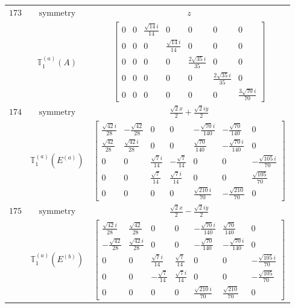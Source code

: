 \documentclass[fleqn,8pt,landscape]{jsarticle}
\begin{document}
\begin{longtable}{ccc}
$ 173 $ & $ \text{symmetry} $ & $ z $ \\
$  $ & $ \mathbb{T}_{1}^{(a)}(A) $ & $ \begin{bmatrix} 0 & 0 & \frac{\sqrt{14} i}{14} & 0 & 0 & 0 & 0 \\ 0 & 0 & 0 & \frac{\sqrt{14} i}{14} & 0 & 0 & 0 \\ 0 & 0 & 0 & 0 & \frac{2 \sqrt{35} i}{35} & 0 & 0 \\ 0 & 0 & 0 & 0 & 0 & \frac{2 \sqrt{35} i}{35} & 0 \\ 0 & 0 & 0 & 0 & 0 & 0 & \frac{3 \sqrt{70} i}{70} \end{bmatrix} $ \\ \hline
$ 174 $ & $ \text{symmetry} $ & $ \frac{\sqrt{2} x}{2} + \frac{\sqrt{2} i y}{2} $ \\
$  $ & $ \mathbb{T}_{1}^{(a)}(E^{(a)}) $ & $ \begin{bmatrix} \frac{\sqrt{42} i}{28} & - \frac{\sqrt{42}}{28} & 0 & 0 & - \frac{\sqrt{70} i}{140} & - \frac{\sqrt{70}}{140} & 0 \\ \frac{\sqrt{42}}{28} & \frac{\sqrt{42} i}{28} & 0 & 0 & \frac{\sqrt{70}}{140} & - \frac{\sqrt{70} i}{140} & 0 \\ 0 & 0 & \frac{\sqrt{7} i}{14} & - \frac{\sqrt{7}}{14} & 0 & 0 & - \frac{\sqrt{105} i}{70} \\ 0 & 0 & \frac{\sqrt{7}}{14} & \frac{\sqrt{7} i}{14} & 0 & 0 & \frac{\sqrt{105}}{70} \\ 0 & 0 & 0 & 0 & \frac{\sqrt{210} i}{70} & - \frac{\sqrt{210}}{70} & 0 \end{bmatrix} $ \\ \hline
$ 175 $ & $ \text{symmetry} $ & $ \frac{\sqrt{2} x}{2} - \frac{\sqrt{2} i y}{2} $ \\
$  $ & $ \mathbb{T}_{1}^{(a)}(E^{(b)}) $ & $ \begin{bmatrix} \frac{\sqrt{42} i}{28} & \frac{\sqrt{42}}{28} & 0 & 0 & - \frac{\sqrt{70} i}{140} & \frac{\sqrt{70}}{140} & 0 \\ - \frac{\sqrt{42}}{28} & \frac{\sqrt{42} i}{28} & 0 & 0 & - \frac{\sqrt{70}}{140} & - \frac{\sqrt{70} i}{140} & 0 \\ 0 & 0 & \frac{\sqrt{7} i}{14} & \frac{\sqrt{7}}{14} & 0 & 0 & - \frac{\sqrt{105} i}{70} \\ 0 & 0 & - \frac{\sqrt{7}}{14} & \frac{\sqrt{7} i}{14} & 0 & 0 & - \frac{\sqrt{105}}{70} \\ 0 & 0 & 0 & 0 & \frac{\sqrt{210} i}{70} & \frac{\sqrt{210}}{70} & 0 \end{bmatrix} $ \\ \hline

\end{longtable}
\end{document}
